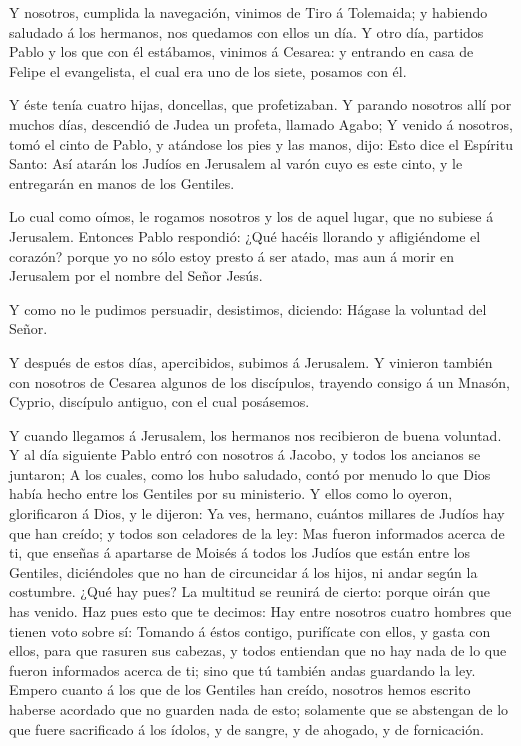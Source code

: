  Y nosotros, cumplida la navegación, vinimos de Tiro á
Tolemaida; y habiendo saludado á los hermanos, nos quedamos con ellos un
día.  Y otro día, partidos Pablo y los que con él estábamos,
vinimos á Cesarea: y entrando en casa de Felipe el evangelista, el cual
era uno de los siete, posamos con él.

 Y éste tenía cuatro hijas, doncellas, que profetizaban.
 Y parando nosotros allí por muchos días, descendió de
Judea un profeta, llamado Agabo;  Y venido á nosotros, tomó
el cinto de Pablo, y atándose los pies y las manos, dijo: Esto dice el
Espíritu Santo: Así atarán los Judíos en Jerusalem al varón cuyo es este
cinto, y le entregarán en manos de los Gentiles.

 Lo cual como oímos, le rogamos nosotros y los de aquel
lugar, que no subiese á Jerusalem.  Entonces Pablo
respondió: ¿Qué hacéis llorando y afligiéndome el corazón? porque yo no
sólo estoy presto á ser atado, mas aun á morir en Jerusalem por el
nombre del Señor Jesús.

 Y como no le pudimos persuadir, desistimos, diciendo:
Hágase la voluntad del Señor.

 Y después de estos días, apercibidos, subimos á Jerusalem.
 Y vinieron también con nosotros de Cesarea algunos de los
discípulos, trayendo consigo á un Mnasón, Cyprio, discípulo antiguo, con
el cual posásemos.

 Y cuando llegamos á Jerusalem, los hermanos nos recibieron
de buena voluntad.  Y al día siguiente Pablo entró con
nosotros á Jacobo, y todos los ancianos se juntaron;  A los
cuales, como los hubo saludado, contó por menudo lo que Dios había hecho
entre los Gentiles por su ministerio.  Y ellos como lo
oyeron, glorificaron á Dios, y le dijeron: Ya ves, hermano, cuántos
millares de Judíos hay que han creído; y todos son celadores de la ley:
 Mas fueron informados acerca de ti, que enseñas á
apartarse de Moisés á todos los Judíos que están entre los Gentiles,
diciéndoles que no han de circuncidar á los hijos, ni andar según la
costumbre.  ¿Qué hay pues? La multitud se reunirá de
cierto: porque oirán que has venido.  Haz pues esto que te
decimos: Hay entre nosotros cuatro hombres que tienen voto sobre sí:
 Tomando á éstos contigo, purifícate con ellos, y gasta con
ellos, para que rasuren sus cabezas, y todos entiendan que no hay nada
de lo que fueron informados acerca de ti; sino que tú también andas
guardando la ley.  Empero cuanto á los que de los Gentiles
han creído, nosotros hemos escrito haberse acordado que no guarden nada
de esto; solamente que se abstengan de lo que fuere sacrificado á los
ídolos, y de sangre, y de ahogado, y de fornicación.

